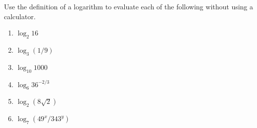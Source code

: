 Use the definition of a logarithm to evaluate each of the following without using a calculator.  

\begin{enumerate}
\item   $\log_2 16$

\item   $\log_3 (1/9)$

\item   $\log_{10} 1000$

\item   $\log_{6} 36^{-2/3}$

\item   $\log_{2} (8\sqrt{2})$

\item $\log_7(49^x/343^y)$



\end{enumerate}
